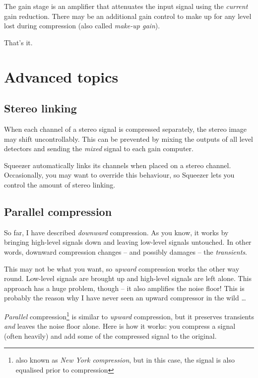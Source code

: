 The gain stage is an amplifier that attenuates the input signal using
the \emph{current} gain reduction.  There may be an additional gain
control to make up for any level lost during compression (also called
\emph{make-up gain}).

That's it.

\section{Advanced topics}
\label{sec:advanced_topics}

\subsection{Stereo linking}
\label{sec:stereo_linking}

When each channel of a stereo signal is compressed separately, the
stereo image may shift uncontrollably.  This can be prevented by
mixing the outputs of all level detectors and sending the \emph{mixed}
signal to each gain computer.

Squeezer automatically links its channels when placed on a stereo
channel.  Occasionally, you may want to override this behaviour, so
Squeezer lets you control the amount of stereo linking.

\subsection{Parallel compression}
\label{sec:parallel_compression}

So far, I have described \emph{downward} compression.  As you know, it
works by bringing high-level signals down and leaving low-level
signals untouched.  In other words, downward compression changes --
and possibly damages -- the \emph{transients}.

This may not be what you want, so \emph{upward} compression works the
other way round.  Low-level signals are brought up and high-level
signals are left alone.  This approach has a huge problem, though --
it also amplifies the noise floor!  This is probably the reason why I
have never seen an upward compressor in the wild \dots

\emph{Parallel} compression\footnote{also known as \emph{New York
    compression}, but in this case, the signal is also equalised prior
  to compression} is similar to \emph{upward} compression, but it
preserves transients \emph{and} leaves the noise floor alone.  Here is
how it works: you compress a signal (often heavily) and add some of
the compressed signal to the original.


